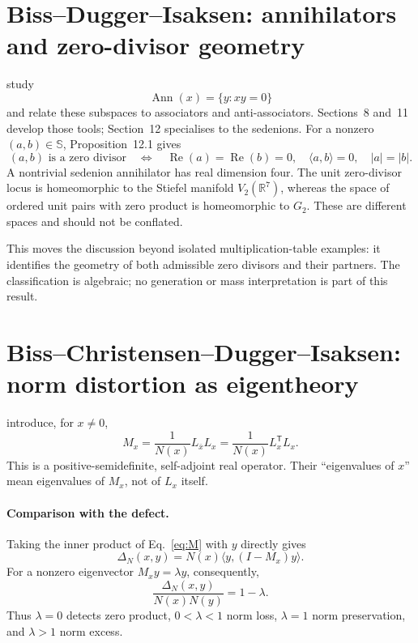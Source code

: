 \documentclass[11pt,a4paper]{article}
\newcommand{\R}{\mathbb R}
\newcommand{\SSS}{\mathbb S}
\newcommand{\ip}[2]{\langle #1,#2\rangle}
\newcommand{\DN}{\Delta_N}
\DeclareMathOperator{\Rea}{Re}
\DeclareMathOperator{\Ann}{Ann}
\numberwithin{equation}{section}
\begin{document}
\section{Biss--Dugger--Isaksen: annihilators and zero-divisor geometry}

\citet{BissDuggerIsaksen2008Annihilators} study
\begin{equation}
 \Ann(x)=\{y:xy=0\}
\end{equation}
and relate these subspaces to associators and anti-associators.
Sections~8 and~11 develop those tools; Section~12 specialises to the
sedenions. For a nonzero $(a,b)\in\SSS$, Proposition~12.1 gives
\begin{equation}
 (a,b)\text{ is a zero divisor}
 \quad\Longleftrightarrow\quad
 \Rea(a)=\Rea(b)=0,\quad
 \ip{a}{b}=0,\quad |a|=|b|.
 \label{eq:zero-condition}
\end{equation}
A nontrivial sedenion annihilator has real dimension four.
The unit zero-divisor locus is homeomorphic to the Stiefel manifold
$V_2(\R^7)$, whereas the space of ordered unit pairs with zero product
is homeomorphic to $G_2$. These are different spaces and should not be
conflated.~\citep[Sec.~12, Proposition~12.1 and following discussion]{BissDuggerIsaksen2008Annihilators}

This moves the discussion beyond isolated multiplication-table examples:
it identifies the geometry of both admissible zero divisors and their
partners. The classification is algebraic; no generation or mass
interpretation is part of this result.

\section{Biss--Christensen--Dugger--Isaksen: norm distortion as eigentheory}

\citet{BissEtAl2009Eigentheory} introduce, for $x\neq0$,
\begin{equation}
 M_x=\frac{1}{N(x)}L_{\bar x}L_x
     =\frac{1}{N(x)}L_x^{\mathsf T}L_x.
 \label{eq:M}
\end{equation}
This is a positive-semidefinite, self-adjoint real operator. Their
``eigenvalues of $x$'' mean eigenvalues of $M_x$, not of $L_x$ itself.
\citep[Definition~3.1 and Sec.~3]{BissEtAl2009Eigentheory}

\paragraph{Comparison with the defect.}
Taking the inner product of Eq.~\eqref{eq:M} with $y$ directly gives
\begin{equation}
 \DN(x,y)=N(x)\ip{y}{(I-M_x)y}.
 \label{eq:defect-operator}
\end{equation}
For a nonzero eigenvector $M_xy=\lambda y$, consequently,
\begin{equation}
 \frac{\DN(x,y)}{N(x)N(y)}=1-\lambda.
\end{equation}
Thus $\lambda=0$ detects zero product, $0<\lambda<1$ norm loss,
$\lambda=1$ norm preservation, and $\lambda>1$ norm excess.
\end{document}
